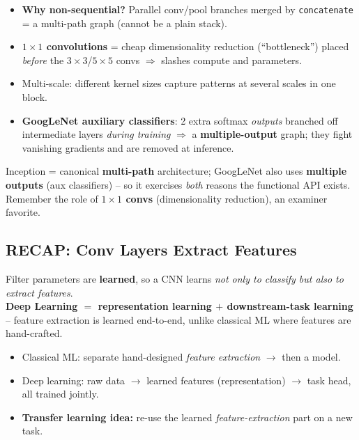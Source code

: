 \documentclass[10pt,a4paper]{article}
\begin{document}
	\begin{itemize}[leftmargin=*]
		\item \textbf{Why non-sequential?} Parallel conv/pool branches merged by \texttt{concatenate} = a multi-path graph (cannot be a plain stack).
		\item \textbf{$1{\times}1$ convolutions} = cheap dimensionality reduction (``bottleneck'') placed \emph{before} the $3{\times}3$/$5{\times}5$ convs $\Rightarrow$ slashes compute and parameters.
		\item Multi-scale: different kernel sizes capture patterns at several scales in one block.
		\item \textbf{GoogLeNet auxiliary classifiers}: 2 extra softmax \emph{outputs} branched off intermediate layers \emph{during training} $\Rightarrow$ a \textbf{multiple-output} graph; they fight vanishing gradients and are removed at inference.
	\end{itemize}

	\begin{examtipbox}
		Inception = canonical \textbf{multi-path} architecture; GoogLeNet also uses \textbf{multiple outputs} (aux classifiers) -- so it exercises \emph{both} reasons the functional API exists. Remember the role of \textbf{$1{\times}1$ convs} (dimensionality reduction), an examiner favorite.
	\end{examtipbox}

	\subsection{RECAP: Conv Layers Extract Features}

	\begin{importantbox}
		Filter parameters are \textbf{learned}, so a CNN learns \emph{not only to classify but also to extract features}. \\
		\textbf{Deep Learning $=$ representation learning $+$ downstream-task learning} -- feature extraction is learned end-to-end, unlike classical ML where features are hand-crafted.
	\end{importantbox}

	\begin{itemize}[leftmargin=*]
		\item Classical ML: separate hand-designed \emph{feature extraction} $\to$ then a model.
		\item Deep learning: raw data $\to$ learned features (representation) $\to$ task head, all trained jointly.
		\item \textbf{Transfer learning idea:} re-use the learned \emph{feature-extraction} part on a new task.
	\end{itemize}
\end{document}
